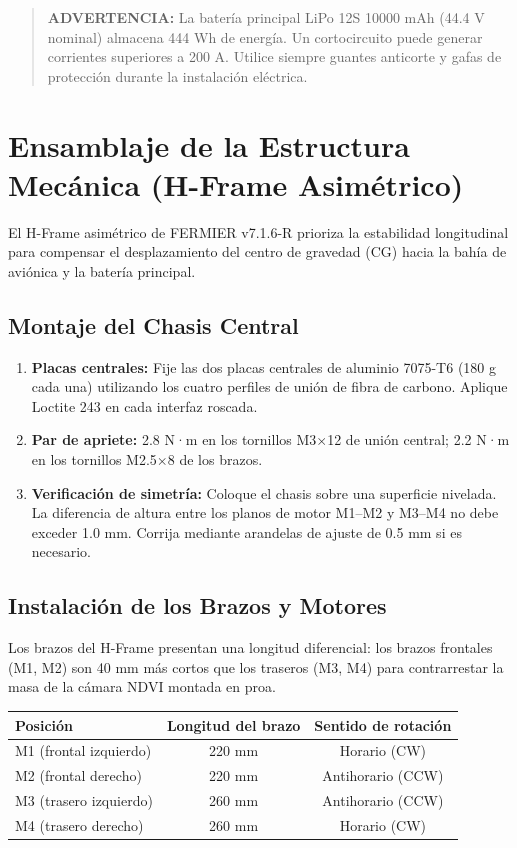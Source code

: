 \begin{quote}
\textbf{ADVERTENCIA:} La batería principal LiPo 12S 10000 mAh (44.4 V nominal) almacena 444 Wh de energía. Un cortocircuito puede generar corrientes superiores a 200 A. Utilice siempre guantes anticorte y gafas de protección durante la instalación eléctrica.
\end{quote}

\section{Ensamblaje de la Estructura Mecánica (H-Frame Asimétrico)}

El H-Frame asimétrico de FERMIER v7.1.6-R prioriza la estabilidad longitudinal para compensar el desplazamiento del centro de gravedad (CG) hacia la bahía de aviónica y la batería principal.

\subsection{Montaje del Chasis Central}

\begin{enumerate}
    \item \textbf{Placas centrales:} Fije las dos placas centrales de aluminio 7075-T6 (180 g cada una) utilizando los cuatro perfiles de unión de fibra de carbono. Aplique Loctite 243 en cada interfaz roscada.
    \item \textbf{Par de apriete:} 2.8 N·m en los tornillos M3$\times$12 de unión central; 2.2 N·m en los tornillos M2.5$\times$8 de los brazos.
    \item \textbf{Verificación de simetría:} Coloque el chasis sobre una superficie nivelada. La diferencia de altura entre los planos de motor M1--M2 y M3--M4 no debe exceder 1.0 mm. Corrija mediante arandelas de ajuste de 0.5 mm si es necesario.
\end{enumerate}

\subsection{Instalación de los Brazos y Motores}

Los brazos del H-Frame presentan una longitud diferencial: los brazos frontales (M1, M2) son 40 mm más cortos que los traseros (M3, M4) para contrarrestar la masa de la cámara NDVI montada en proa.

\begin{table}[h]
\centering
\begin{tabular}{|l|c|c|}
\hline
\textbf{Posición} & \textbf{Longitud del brazo} & \textbf{Sentido de rotación} \\ \hline
M1 (frontal izquierdo) & 220 mm & Horario (CW) \\ \hline
M2 (frontal derecho) & 220 mm & Antihorario (CCW) \\ \hline
M3 (trasero izquierdo) & 260 mm & Antihorario (CCW) \\ \hline
M4 (trasero derecho) & 260 mm & Horario (CW) \\ \hline
\end{tabular}
\end{table}

